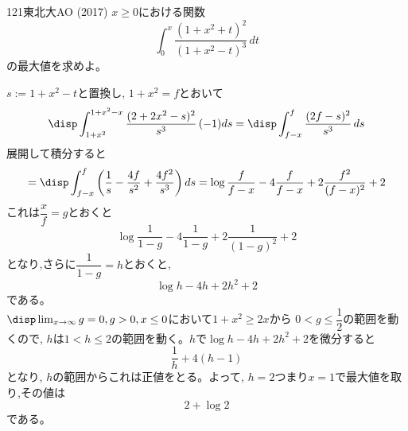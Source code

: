 \begin{thm}{121}{}{東北大AO (2017)}
 $x \geq 0$における関数
 \[ \int_0^x\! \frac{(1+x^2+t)^2}{(1+x^2-t)^3} \,dt \]
 の最大値を求めよ。
\end{thm}

$s:=1+x^2-t$と置換し, $1+x^2=f$とおいて
\[\disp\int_{1+x^2}^{1+x^2-x} \dfrac{(2+2x^2-s)^2}{s^3} \,(-1)ds=\disp\int_{f-x}^{f} \dfrac{(2f-s)^2}{s^3} \,ds \]
展開して積分すると
\[=\disp\int_{f-x}^{f}\left(\dfrac{1}{s} -\dfrac{4f}{s^2}+\dfrac{4f^2}{s^3}\right)ds=\log{\dfrac{f}{f-x}}-4\dfrac{f}{f-x} +2\dfrac{f^2}{(f-x)^2}+2\]
これは$\dfrac{x}{f}=g$とおくと
\[\log{\dfrac{1}{1-g}}-4\dfrac{1}{1-g}+2\dfrac{1}{(1-g)^2}+2\]
となり,さらに$\dfrac{1}{1-g}=h$とおくと,
\[\log{h}-4h+2h^2+2\]
である。\\
$\disp\lim_{x\to\infty}g=0, g>0, x\leq 0$において$1+x^2\geq 2x$から $0<g\leq\dfrac{1}{2}$の範囲を動くので, $h$は$1<h\leq 2$の範囲を動く。$h$で$\log{h}-4h+2h^2+2$を微分すると
\[\dfrac{1}{h}+4(h-1)\]
となり, $h$の範囲からこれは正値をとる。よって, $h=2$つまり$x=1$で最大値を取り,その値は
\[2+\log{2}\]
である。
